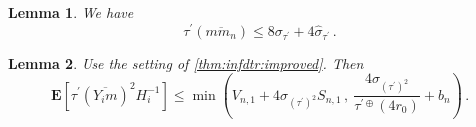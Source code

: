 \documentclass[10pt,a4paper]{amsart}
\newtheorem{lemma}{Lemma}
\newcommand{\E}{\mathbf{E}} %
\newcommand{\EOf}[1]{\E\abOf{#1}}
\newcommand{\ab}[1]{\lab #1 \rab} %
\newcommand{\abOf}[1]{\!\ab{#1}} %
\newcommand{\br}[1]{\lb #1 \rb} %
\newcommand{\brOf}[1]{\!\br{#1}} %
\newcommand{\ddrtran}{\tau^{\prime\oplus}}
\newcommand{\dtran}{\tau\pr}
\newcommand{\eqcm}{\,,} %
\newcommand{\eqfs}{\,.}
\newcommand{\lab}{\left[} %
\newcommand{\lb}{\left(} %
\newcommand{\ol}[2]{\overline{#1#2}}
\newcommand{\pr}{^\prime}
\newcommand{\rab}{\right]} %
\newcommand{\rb}{\right)} %
\begin{document}
\begin{lemma}\label{lmm:mmn:dtran:bound}
    We have
    \begin{equation}
        \dtran(\ol m{m_n})
        \leq
        8 \sigma_{\dtran} + 4 \hat\sigma_{\dtran}
        \eqfs
    \end{equation}
\end{lemma}

\begin{lemma}\label{lmm:infdtr:technical}
    Use the setting of \cref{thm:infdtr:improved}.
    Then
    \begin{equation}
        \EOf{\dtran(\ol{Y_i}m)^2 H_i^{-1}}
        \leq
        \min\brOf{V_{n,1} + 4 \sigma_{(\dtran)^{2}} S_{n,1}\eqcm \ \frac{4 \sigma_{(\dtran)^2}}{\ddrtran(4r_0)}
            +
            b_n}
        \eqfs
    \end{equation}
\end{lemma}
\end{document}
